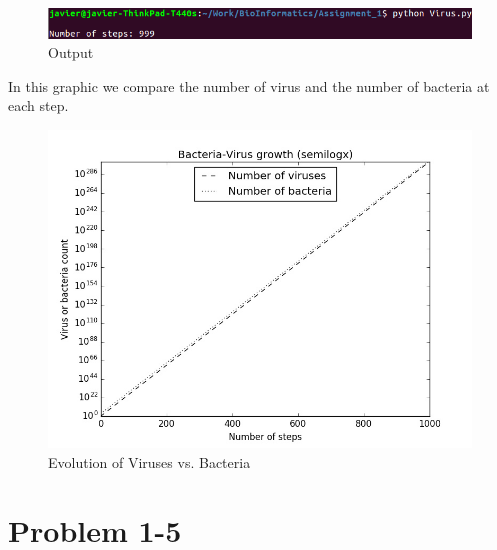 \documentclass{article}
\begin{document}
\begin{figure}[H]
\begin{center}
\includegraphics[scale = .6]{output}
\end{center}
\caption{Output}
\end{figure}

In this graphic we compare the number of virus and the number of bacteria at each step.

\begin{figure}[H]
\begin{center}
\includegraphics[scale = .4]{Virus}
\end{center}
\caption{Evolution of Viruses vs. Bacteria}
\end{figure}

\section*{Problem 1-5}
\end{document}
